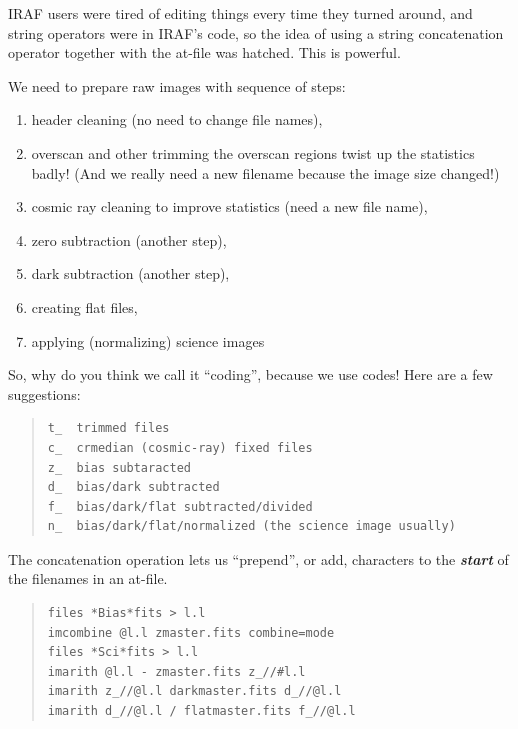 \documentclass[letter,11pt,oneside]{article}
\begin{document}
IRAF users were tired of editing things every time they turned around,
and string operators were in IRAF's code, so the idea of using
a string concatenation operator {\color{verbcolor}{\verb#//#}} together
with the at-file was hatched. This is powerful.

We need to prepare raw images with sequence of steps:

\vspace{-.15cm}
\begin{enumerate}[resume]\addtolength{\itemsep}{-0.5\baselineskip}
   \item   header cleaning (no need to change file names),
   \item   overscan and other trimming the overscan regions twist up
the statistics badly! (And we really need a new filename because the image size changed!)
   \item   cosmic ray cleaning to improve statistics (need a new file name),
   \item   zero subtraction (another step),
   \item   dark subtraction (another step),
   \item   creating flat files,
   \item   applying (normalizing) science images
\end{enumerate}

So, why do you think we call it ``coding'', because we use codes! Here are
a few suggestions:

\begin{quote}
\begingroup \fontsize{10pt}{10pt}
\selectfont
\begin{verbatim}
t_  trimmed files
c_  crmedian (cosmic-ray) fixed files
z_  bias subtaracted
d_  bias/dark subtracted
f_  bias/dark/flat subtracted/divided
n_  bias/dark/flat/normalized (the science image usually)
\end{verbatim}
\endgroup
\end{quote}

The concatenation operation lets us ``prepend'', or add, characters to the \textbf{\emph{start}}
of the filenames in an at-file.

{\color{verbcolor}
\begin{quote}
\begingroup \fontsize{10pt}{10pt}
\selectfont
\begin{verbatim}
files *Bias*fits > l.l
imcombine @l.l zmaster.fits combine=mode
files *Sci*fits > l.l
imarith @l.l - zmaster.fits z_//#l.l
imarith z_//@l.l darkmaster.fits d_//@l.l
imarith d_//@l.l / flatmaster.fits f_//@l.l
\end{verbatim}
\endgroup
\end{quote}
}
\end{document}
